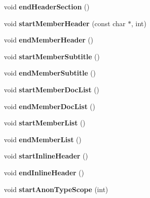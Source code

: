 \begin{DoxyCompactItemize}
void {\bfseries end\+Header\+Section} ()
\item 
\mbox{\label{class_r_t_f_generator_af3bab60ac2e4299b8475a42a8b16c761}} 
void {\bfseries start\+Member\+Header} (const char $\ast$, int)
\item 
\mbox{\label{class_r_t_f_generator_abeb6f88fba52b06469815b77955c08c4}} 
void {\bfseries end\+Member\+Header} ()
\item 
\mbox{\label{class_r_t_f_generator_a345410be789206cba4ff9a83c2c35f10}} 
void {\bfseries start\+Member\+Subtitle} ()
\item 
\mbox{\label{class_r_t_f_generator_a4009bce7747144b2da4a0c348979530a}} 
void {\bfseries end\+Member\+Subtitle} ()
\item 
\mbox{\label{class_r_t_f_generator_aa34bc87c9ef0a6de2da83d975614a3ce}} 
void {\bfseries start\+Member\+Doc\+List} ()
\item 
\mbox{\label{class_r_t_f_generator_ac0999848e2812490e2abbdfe8502756a}} 
void {\bfseries end\+Member\+Doc\+List} ()
\item 
\mbox{\label{class_r_t_f_generator_aa4311935ebcc3dc94c2aa1d0da50ce4d}} 
void {\bfseries start\+Member\+List} ()
\item 
\mbox{\label{class_r_t_f_generator_a026c22840d726a32660cc3d4d58b0c79}} 
void {\bfseries end\+Member\+List} ()
\item 
\mbox{\label{class_r_t_f_generator_a619545578f99c0642f9d2f82dba69468}} 
void {\bfseries start\+Inline\+Header} ()
\item 
\mbox{\label{class_r_t_f_generator_a264502d6589fff99ab0e01f3600cad57}} 
void {\bfseries end\+Inline\+Header} ()
\item 
\mbox{\label{class_r_t_f_generator_abb1984b3f75a50b57e68fff9570a608e}} 
void {\bfseries start\+Anon\+Type\+Scope} (int)
\item 

\end{DoxyCompactItemize}

